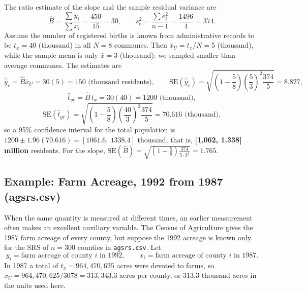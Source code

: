 \documentclass[
  letterpaper,
  DIV=11,
  numbers=noendperiod]{scrreprt}
\renewcommand{\[}{\begin{equation}}
\renewcommand{\]}{\end{equation}}
\begin{document}
The ratio estimate of the slope and the sample residual variance are \[
\hat B = \frac{\sum y_i}{\sum x_i} = \frac{450}{15} = 30,
\qquad
s_e^2 = \frac{\sum e_i^2}{n-1} = \frac{1496}{4} = 374 .
\] Assume the number of registered births is known from administrative
records to be \(t_x = 40\) (thousand) in all \(N = 8\) communes. Then
\(\bar x_U = t_x/N = 5\) (thousand), while the sample mean is only
\(\bar x = 3\) (thousand): we sampled smaller-than-average communes. The
estimates are \[
\hat{\bar y}_r = \hat B\bar x_U = 30(5) = 150 \text{ (thousand residents)},
\qquad
\text{SE}(\hat{\bar y}_r) = \sqrt{\left(1 - \frac58\right)\left(\frac53\right)^2\frac{374}{5}} = 8.827,
\] \[
\hat t_{yr} = \hat B\,t_x = 30(40) = 1200 \text{ (thousand)},
\] \[
\text{SE}(\hat t_{yr}) = \sqrt{\left(1 - \frac58\right)\left(\frac{40}{3}\right)^2\frac{374}{5}} = 70.616 \text{ (thousand)},
\] so a 95\% confidence interval for the total population is
\(1200 \pm 1.96(70.616) = [1061.6,\ 1338.4]\) thousand, that is,
\textbf{{[}1.062, 1.338{]} million} residents. For the slope,
\(\text{SE}(\hat B) = \sqrt{\left(1 - \frac58\right)\frac{374}{5\cdot 3^2}} = 1.765\).

\subsection{Example: Farm Acreage, 1992 from 1987
(agsrs.csv)}\label{sec-ratio-agsrs}

When the same quantity is measured at different times, an earlier
measurement often makes an excellent auxiliary variable. The Census of
Agriculture gives the 1987 farm acreage of every county, but suppose the
1992 acreage is known only for the SRS of \(n = 300\) counties in
\texttt{agsrs.csv}. Let \[
y_i = \text{farm acreage of county } i \text{ in 1992}, \qquad
x_i = \text{farm acreage of county } i \text{ in 1987}.
\] In 1987 a total of \(t_x = 964{,}470{,}625\) acres were devoted to
farms, so \(\bar x_U = 964{,}470{,}625/3078 = 313{,}343.3\) acres per
county, or \(313.3\) thousand acres in the units used here.
\end{document}
